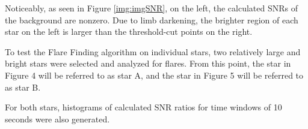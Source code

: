 \documentclass{article}
\begin{document}
\begin{multicols}{2}

Noticeably, as seen in Figure \ref{img:imgSNR}, on the left, the calculated SNRs of the background are nonzero. Due to limb darkening, the brighter region of each star on the left  is larger than the threshold-cut points on the right. 

To test the Flare Finding algorithm on individual stars, two relatively large and bright stars were selected and analyzed for flares. From this point, the star in Figure 4 will be referred to as star A, and the star in Figure 5 will be referred to as star B.

For both stars, histograms of calculated SNR ratios for time windows of 10 seconds were also generated.

\end{multicols}
\end{document}
